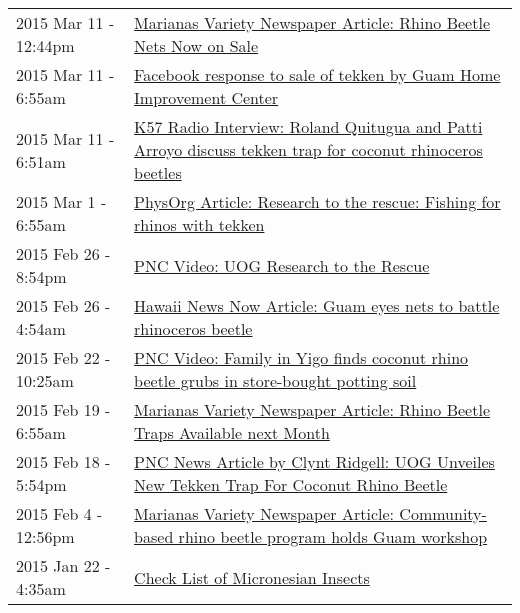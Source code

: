 \begin{longtable}{p{} p{}}
2015 Mar 11 - 12:44pm & \href{http://guaminsects.net/anr/content/marianas-variety-newspaper-article-rhino-beetle-nets-now-sale}{Marianas Variety Newspaper Article: Rhino Beetle Nets Now on Sale} \\
2015 Mar 11 - 6:55am & \href{http://guaminsects.net/anr/content/facebook-response-sale-tekken-guam-home-improvement-center}{Facebook response to sale of tekken by Guam Home Improvement Center} \\
2015 Mar 11 - 6:51am & \href{http://guaminsects.net/anr/content/k57-radio-interview-roland-quitugua-and-patti-arroyo-discuss-tekken-trap-coconut-rhinoceros-}{K57 Radio Interview: Roland Quitugua and Patti Arroyo discuss tekken trap for coconut rhinoceros beetles} \\
2015 Mar 1 - 6:55am & \href{http://guaminsects.net/anr/content/physorg-article-research-rescue-fishing-rhinos-tekken}{PhysOrg Article: Research to the rescue: Fishing for rhinos with tekken} \\
2015 Feb 26 - 8:54pm & \href{http://guaminsects.net/anr/content/pnc-video-uog-research-rescue}{PNC Video: UOG Research to the Rescue} \\
2015 Feb 26 - 4:54am & \href{http://guaminsects.net/anr/content/hawaii-news-now-article-guam-eyes-nets-battle-rhinoceros-beetle}{Hawaii News Now Article: Guam eyes nets to battle rhinoceros beetle} \\
2015 Feb 22 - 10:25am & \href{http://guaminsects.net/anr/content/pnc-video-family-yigo-finds-coconut-rhino-beetle-grubs-store-bought-potting-soil}{PNC Video: Family in Yigo finds coconut rhino beetle grubs in store-bought potting soil} \\
2015 Feb 19 - 6:55am & \href{http://guaminsects.net/anr/content/marianas-variety-newspaper-article-rhino-beetle-traps-available-next-month}{Marianas Variety Newspaper Article: Rhino Beetle Traps Available next Month} \\
2015 Feb 18 - 5:54pm & \href{http://guaminsects.net/anr/content/pnc-news-article-clynt-ridgell-uog-unveiles-new-tekken-trap-coconut-rhino-beetle}{PNC News Article by Clynt Ridgell: UOG Unveiles New Tekken Trap For Coconut Rhino Beetle} \\
2015 Feb 4 - 12:56pm & \href{http://guaminsects.net/anr/content/marianas-variety-newspaper-article-community-based-rhino-beetle-program-holds-guam-workshop}{Marianas Variety Newspaper Article: Community-based rhino beetle program holds Guam workshop} \\
2015 Jan 22 - 4:35am & \href{http://guaminsects.net/anr/content/check-list-micronesian-insects}{Check List of Micronesian Insects} \\

\end{longtable}

